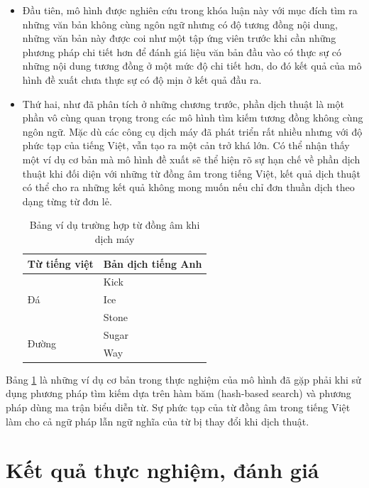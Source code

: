\documentclass[12pt]{report}
\begin{document}
\begin{itemize}
	\item Đầu tiên, mô hình được nghiên cứu trong khóa luận này với mục đích tìm ra những văn bản không cùng ngôn ngữ nhưng có độ tương đồng nội dung, những văn bản này được coi như một tập ứng viên trước khi cần những phương pháp chi tiết hơn để đánh giá liệu văn bản đầu vào có thực sự có những nội dung tương đồng ở một mức độ chi tiết hơn, do đó kết quả của mô hình đề xuất chưa thực sự có độ mịn ở kết quả đầu ra.
	\item Thứ hai, như đã  phân tích ở những chương trước, phần dịch thuật là một phần vô cùng quan trọng trong các mô hình tìm kiếm tương đồng không cùng ngôn ngữ. Mặc dù các công cụ dịch máy đã phát triển rất nhiều nhưng với độ phức tạp của tiếng Việt, vẫn tạo ra một cản trở khá lớn. Có thể nhận thấy một ví dụ cơ bản mà mô hình đề xuất sẽ thể hiện rõ sự hạn chế về phần dịch thuật khi đối diện với những từ đồng âm trong tiếng Việt, kết quả dịch thuật có thể cho ra những kết quả không mong muốn nếu chỉ đơn thuần dịch theo dạng từng từ đơn lẻ.

	\begin{table}[H]
		\centering
		\caption{Bảng ví dụ trường hợp từ đồng âm khi dịch máy}
		\label{table: example-translate}
		\begin{tabular}{|l|l|}
		\hline
		Từ tiếng việt          & Bản dịch tiếng Anh \\ \hline
		\multirow{3}{*}{Đá}    & Kick               \\ \cline{2-2} 
													 & Ice                \\ \cline{2-2} 
													 & Stone              \\ \hline
		\multirow{2}{*}{Đường} & Sugar              \\ \cline{2-2} 
													 & Way                \\ \hline
		\end{tabular}
	\end{table}
\end{itemize}

Bảng \ref{table: example-translate} là những ví dụ cơ bản trong thực nghiệm của mô hình đã gặp phải khi sử dụng phương pháp tìm kiếm dựa trên hàm băm (hash-based search) và phương pháp dùng ma trận biểu diễn từ. Sự phức tạp của từ đồng âm trong tiếng Việt làm cho cả ngữ pháp lẫn ngữ nghĩa của từ bị thay đổi khi dịch thuật.


\chapter{Kết quả thực nghiệm, đánh giá}
\label{chap:Experimental}
\end{document}
